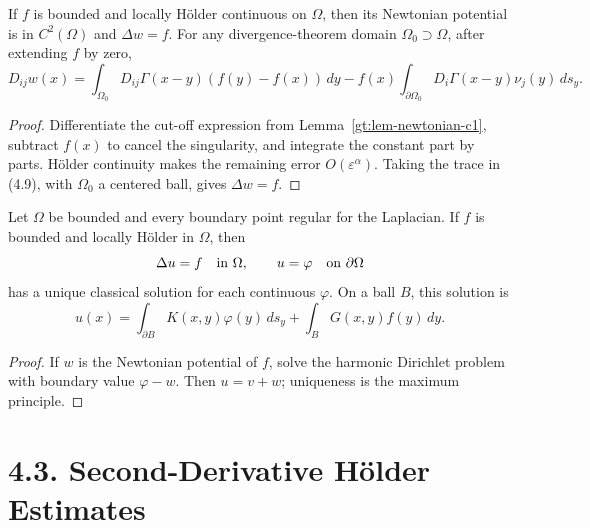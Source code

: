 \begin{lemma}\label{gt:lem-newtonian-c2}
If $f$ is bounded and locally H\"older continuous on $\Omega$, then its
Newtonian potential is in $C^2(\Omega)$ and $\Delta w=f$. For any
divergence-theorem domain $\Omega_0\supset\Omega$, after extending $f$ by
zero,
\begin{equation}
\tag{4.9}
D_{ij}w(x)=\int_{\Omega_0}D_{ij}\Gamma(x-y)(f(y)-f(x))\,dy
-f(x)\int_{\partial\Omega_0}D_i\Gamma(x-y)\nu_j(y)\,ds_y.
\end{equation}
\end{lemma}
\begin{proof}
\sketch Differentiate the cut-off expression from Lemma~\ref{gt:lem-newtonian-c1},
subtract $f(x)$ to cancel the singularity, and integrate the constant part by
parts. H\"older continuity makes the remaining error $O(\varepsilon^\alpha)$.
Taking the trace in (4.9), with $\Omega_0$ a centered ball, gives
$\Delta w=f$.
\end{proof}

\begin{theorem}\label{gt:thm-dirichlet-poisson}
Let $\Omega$ be bounded and every boundary point regular for the Laplacian.
If $f$ is bounded and locally H\"older in $\Omega$, then
\[
\Delta u=f\quad\hbox{in }\Omega,
\qquad u=\varphi\quad\hbox{on }\partial\Omega
\]
has a unique classical solution for each continuous $\varphi$. On a ball
$B$, this solution is
\begin{equation}
\tag{4.10}
u(x)=\int_{\partial B}K(x,y)\varphi(y)\,ds_y
+\int_BG(x,y)f(y)\,dy.
\end{equation}
\end{theorem}
\begin{proof}
\sketch If $w$ is the Newtonian potential of $f$, solve the harmonic
Dirichlet problem with boundary value $\varphi-w$. Then $u=v+w$; uniqueness
is the maximum principle.
\end{proof}

\section*{4.3. Second-Derivative H\"older Estimates}

